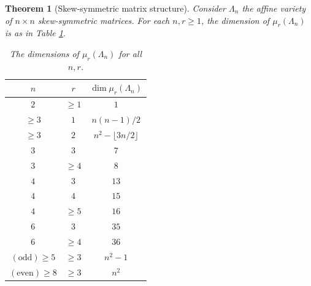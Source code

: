 \documentclass[reqno]{amsart}
\newtheorem{theorem}{Theorem}[section]
\theoremstyle{definition}
\numberwithin{equation}{section}
\begin{document}
\begin{theorem}[Skew-symmetric matrix structure] 
    Consider $\Lambda_n$ the affine variety of $n \times n$ skew-symmetric matrices. For each $n,r \geq 1$, the dimension of $\mu_r(\Lambda_n)$ is as in Table \ref{table:dimensions, skew-symmetric structure}.
    \begin{table}[t!]
        \centering
        \begin{tabular}{|c|c|c|}
            \hline
            $n$ & $r$ & $\dim \mu_r(\Lambda_n)$ \\ \hline
            $2$ & $\geq 1$ & $1$ \\ \hline
            $\geq 3$ & $1$ & $n(n-1)/2$ \\ \hline
            $\geq 3$ & $2$ & $n^2-\lfloor 3n/2 \rfloor$ \\ \hline
            $3$ & $3$ & $7$ \\
            $3$ & $\geq 4$ & $8$\\ \hline
            $4$ & $3$ & $13$\\
            $4$ & $4$ & $15$\\
            $4$ & $\geq 5$ & $16$\\ \hline
            $6$ & $3$ & $35$ \\
            $6$ & $\geq 4$ & $36$ \\ \hline 
            $(\text{odd})\geq 5$ & $\geq 3$ & $n^2-1$\\ \hline
            $(\text{even})\geq 8$ & $\geq 3$ & $n^2$ \\ \hline
        \end{tabular}
        \caption{The dimensions of $\mu_r(\Lambda_n)$ for all $n,r$.}
        \label{table:dimensions, skew-symmetric structure}
    \end{table}
\end{theorem}
\end{document}
